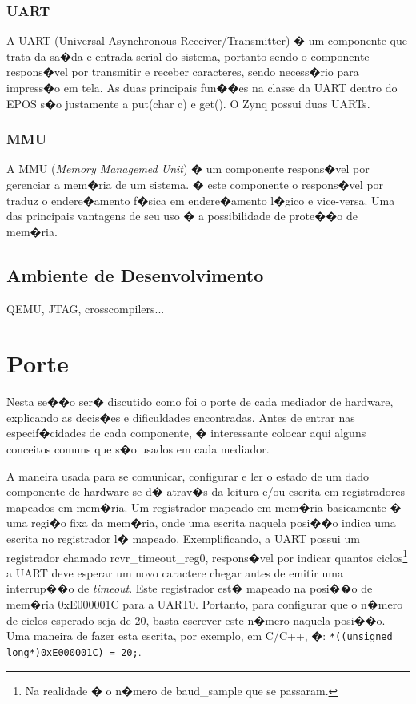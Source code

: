 \documentclass{ufscThesis/ufscThesis} %
\begin{document}
\subsection{UART}
A UART (Universal Asynchronous Receiver/Transmitter) � um componente que trata da sa�da e entrada serial do sistema, portanto sendo o componente respons�vel por transmitir e receber caracteres, sendo necess�rio para impress�o em tela. As duas principais fun��es na classe da UART dentro do EPOS s�o justamente a put(char c) e get(). O Zynq possui duas UARTs.



\subsection{MMU} %

A MMU (\emph{Memory Managemed Unit}) � um componente respons�vel por gerenciar a mem�ria de um sistema. � este componente o respons�vel por traduz o endere�amento f�sica em endere�amento l�gico e vice-versa. Uma das principais vantagens de seu uso � a possibilidade de prote��o de mem�ria.

\section{Ambiente de Desenvolvimento}

QEMU, JTAG, crosscompilers...

\chapter{Porte}

Nesta se��o ser� discutido como foi o porte de cada mediador de hardware, explicando as decis�es e dificuldades encontradas.
Antes de entrar nas especif�cidades de cada componente, � interessante colocar aqui alguns conceitos comuns que s�o usados em cada mediador.

A maneira usada para se comunicar, configurar e ler o estado de um dado componente de hardware se d� atrav�s da leitura e/ou escrita em registradores mapeados em mem�ria. Um registrador mapeado em mem�ria basicamente � uma regi�o fixa da mem�ria, onde uma escrita naquela posi��o indica uma escrita no registrador l� mapeado.
Exemplificando, a UART possui um registrador chamado rcvr\_timeout\_reg0, respons�vel por indicar quantos ciclos\footnote{Na realidade � o n�mero de baud\_sample que se passaram.} a UART deve esperar um novo caractere chegar antes de emitir uma interrup��o de \emph{timeout}. Este registrador est� mapeado na posi��o de mem�ria 0xE000001C para a UART0. Portanto, para configurar que o n�mero de ciclos esperado seja de 20, basta escrever este n�mero naquela posi��o. Uma maneira de fazer esta escrita, por exemplo, em C/C++, �: \verb+*((unsigned long*)0xE000001C) = 20;+.
\end{document}
